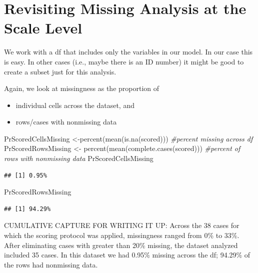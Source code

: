 \documentclass[
  english,
]{book}
\newenvironment{Shaded}{\begin{snugshade}}{\end{snugshade}}
\newcommand{\CommentTok}[1]{\textcolor[rgb]{0.56,0.35,0.01}{\textit{#1}}}
\newcommand{\FunctionTok}[1]{\textcolor[rgb]{0.00,0.00,0.00}{#1}}
\newcommand{\NormalTok}[1]{#1}
\newcommand{\OtherTok}[1]{\textcolor[rgb]{0.56,0.35,0.01}{#1}}
\providecommand{\tightlist}{%
  \setlength{\itemsep}{0pt}\setlength{\parskip}{0pt}}
\begin{document}
\hypertarget{revisiting-missing-analysis-at-the-scale-level}{%
\section{Revisiting Missing Analysis at the Scale Level}\label{revisiting-missing-analysis-at-the-scale-level}}

We work with a df that includes only the variables in our model. In our case this is easy. In other cases (i.e., maybe there is an ID number) it might be good to create a subset just for this analysis.

Again, we look at missingness as the proportion of

\begin{itemize}
\tightlist
\item
  individual cells across the dataset, and
\item
  rows/cases with nonmissing data
\end{itemize}

\begin{Shaded}
\begin{Highlighting}[]
\NormalTok{PrScoredCellsMissing }\OtherTok{\textless{}{-}}\FunctionTok{percent}\NormalTok{(}\FunctionTok{mean}\NormalTok{(}\FunctionTok{is.na}\NormalTok{(scored))) }\CommentTok{\#percent missing across df}
\NormalTok{PrScoredRowsMissing }\OtherTok{\textless{}{-}} \FunctionTok{percent}\NormalTok{(}\FunctionTok{mean}\NormalTok{(}\FunctionTok{complete.cases}\NormalTok{(scored))) }\CommentTok{\#percent of rows with nonmissing data}
\NormalTok{PrScoredCellsMissing}
\end{Highlighting}
\end{Shaded}

\begin{verbatim}
## [1] 0.95%
\end{verbatim}

\begin{Shaded}
\begin{Highlighting}[]
\NormalTok{PrScoredRowsMissing}
\end{Highlighting}
\end{Shaded}

\begin{verbatim}
## [1] 94.29%
\end{verbatim}

CUMULATIVE CAPTURE FOR WRITING IT UP: Across the 38 cases for which the scoring protocol was applied, missingness ranged from 0\% to 33\%. After eliminating cases with greater than 20\% missing, the dataset analyzed included 35 cases. In this dataset we had 0.95\% missing across the df; 94.29\% of the rows had nonmissing data.
\end{document}
